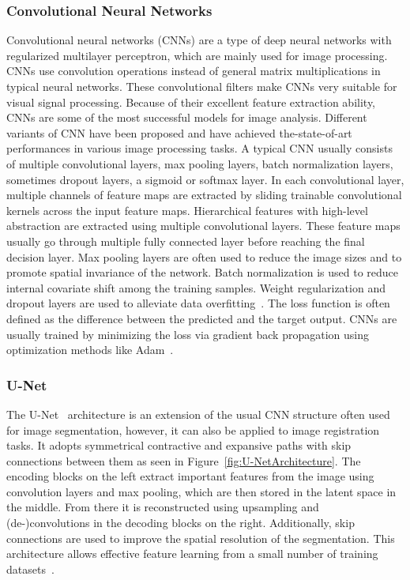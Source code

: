 \documentclass[english,version-2022-01]{uzl-thesis} %
\begin{document}
\subsubsection{Convolutional Neural Networks} \label{SubSubSec:CNNs}
Convolutional neural networks (CNNs) are a type of deep neural networks with regularized multilayer perceptron, which are mainly used for image processing. CNNs use convolution operations instead of general matrix multiplications in typical neural networks. These convolutional filters make CNNs very suitable for visual signal processing. Because of their excellent feature extraction ability, CNNs are some of the most successful models for image analysis. Different variants of CNN have been proposed and have achieved the-state-of-art performances in various image processing tasks. A typical CNN usually consists of multiple convolutional layers, max pooling layers, batch normalization layers, sometimes dropout layers, a sigmoid or softmax layer. In each convolutional layer, multiple channels of feature maps are extracted by sliding trainable convolutional kernels across the input feature maps. Hierarchical features with high-level abstraction are extracted using multiple convolutional layers. These feature maps usually go through multiple fully connected layer before reaching the final decision layer. Max pooling layers are often used to reduce the image sizes and to promote spatial invariance of the network. Batch normalization is used to reduce internal covariate shift among the training samples. Weight regularization and dropout layers are used to alleviate data overfitting~\cite{Fu2020}. The loss function is often defined as the difference between the predicted and the target output. CNNs are usually trained by minimizing the loss via gradient back propagation using optimization methods like Adam~\cite{Adam}. %

\subsubsection{U-Net} \label{SubSubSec:U-Net}
The U-Net~\cite{U-Net} architecture is an extension of the usual CNN structure often used for image segmentation, however, it can also be applied to image registration tasks. It adopts symmetrical contractive and expansive paths with skip connections between them as seen in Figure~\ref{fig:U-NetArchitecture}. The encoding blocks on the left extract important features from the image using convolution layers and max pooling, which are then stored in the latent space in the middle. From there it is reconstructed using upsampling and (de-)convolutions in the decoding blocks on the right. Additionally, skip connections are used to improve the spatial resolution of the segmentation. This architecture allows effective feature learning from a small number of training datasets~\cite{Fu2020}. 
\end{document}
